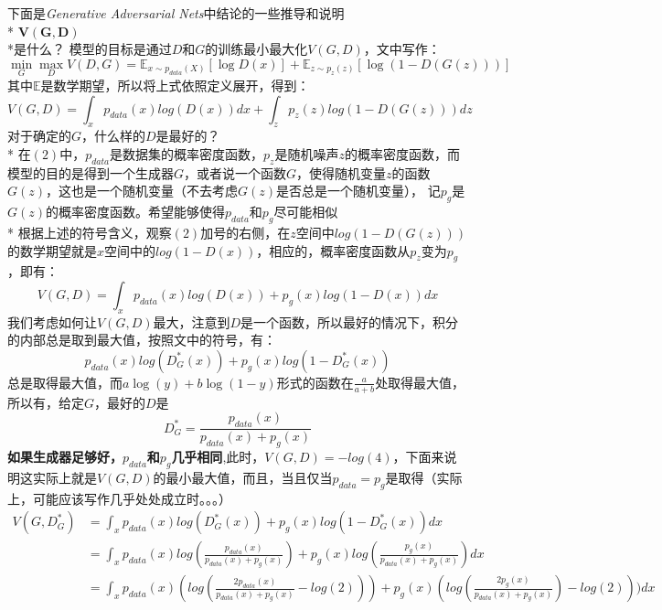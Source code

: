\documentclass[a4paper, 11pt]{article}
\begin{document}
\begin{CJK}{UTF8}{gbsn}
下面是\textit{Generative Adversarial Nets}中结论的一些推导和说明\\*
$\mathbf{V(G, D)}$\\*是什么？
模型的目标是通过$D$和$G$的训练最小最大化$V(G, D)$，文中写作：
\begin{equation}
\min\limits_{G}\max\limits_{D}V(D, G) = \mathbb{E}_{x\sim p_{data}(X)}[\log D(x)] + \mathbb{E}_{z\sim p_{z}(z)}[\log(1 - D(G(z)))]
\end{equation}
其中$\mathbb{E}$是数学期望，所以将上式依照定义展开，得到：
\begin{equation}
V(G, D) = \int_{x}p_{data}(x)log(D(x))dx +\int_{z}p_{z}(z)log(1-D(G(z)))dz
\end{equation}
对于确定的$G$，什么样的$D$是最好的？\\*
在$(2)$中，$p_{data}$是数据集的概率密度函数，$p_{z}$是随机噪声$z$的概率密度函数，而模型的目的是得到一个生成器$G$，或者说一个函数$G$，使得随机变量$z$的函数$G(z)$，这也是一个随机变量（不去考虑$G(z)$是否总是一个随机变量）， 记$p_{g}$是$G(z)$的概率密度函数。希望能够使得$p_{data}$和$p_{g}$尽可能相似\\*
根据上述的符号含义，观察$(2)$加号的右侧，在$z$空间中$log(1-D(G(z)))$的数学期望就是$x$空间中的$log(1-D(x))$，相应的，概率密度函数从$p_{z}$变为$p_{g}$，即有：
\begin{equation}
V(G,D) = \int_{x}p_{data}(x)log(D(x)) + p_{g}(x)log(1-D(x))dx
\end{equation}
我们考虑如何让$V(G,D)$最大，注意到$D$是一个函数，所以最好的情况下，积分的内部总是取到最大值，按照文中的符号，有：
\[p_{data}(x)log(D_{G}^{*}(x)) + p_{g}(x)log(1-D_{G}^{*}(x))\]
总是取得最大值，而$a\log(y)+b\log(1-y)$形式的函数在$\frac{a}{a+b}$处取得最大值，所以有，给定$G$，最好的$D$是
\begin{equation}
D_{G}^{*} = \frac{p_{data}(x)}{p_{data}(x)+p_g(x)}
\end{equation}
\textbf{如果生成器足够好，}$p_{data}$\textbf{和}$p_{g}$\textbf{几乎相同},此时，$V(G,D)=-log(4)$，下面来说明这实际上就是$V(G,D)$的最小最大值，而且，当且仅当$p_{data}=p_{g}$是取得（实际上，可能应该写作几乎处处成立时。。。）
\[
\begin{split}
V(G,D_{G}^{*})&=\int_{x}p_{data}(x)log(D_{G}^{*}(x)) + p_{g}(x)log(1-D_{G}^{*}(x))dx\\
&=\int_{x}p_{data}(x)log(\frac{p_{data}(x)}{p_{data}(x)+p_{g}(x)})+p_{g}(x)log(\frac{p_{g}(x)}{p_{data}(x)+p_{g}(x)})dx\\
&=\int_{x}p_{data}(x)(log(\frac{2p_{data}(x)}{p_{data}(x)+p_{g}(x)}-log(2)))+p_{g}(x)(log(\frac{2p_{g}(x)}{p_{data}(x)+p_{g}(x)})-log(2)))dx\\

\end{split}\]
\end{CJK}
\end{document}
